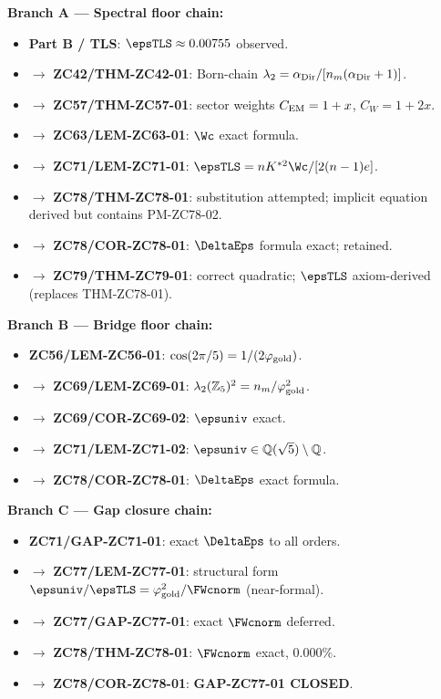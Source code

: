 \documentclass[12pt, a4paper]{article}
\begin{document}
\begin{genealogybox}[title={How ZC78's Key Objects Trace Back}]

\textbf{Branch A --- Spectral floor chain:}
\begin{itemize}[leftmargin=2em, noitemsep]
  \item \textbf{Part B / TLS}: $\epsTLS \approx 0.00755$ observed.
  \item $\to$ \textbf{ZC42/THM-ZC42-01}: Born-chain
    $\lambda_2 = \alpha_{\rm Dir}/[n_m(\alpha_{\rm Dir}+1)]$.
  \item $\to$ \textbf{ZC57/THM-ZC57-01}: sector weights
    $C_{\rm EM} = 1+x$, $C_W = 1+2x$.
  \item $\to$ \textbf{ZC63/LEM-ZC63-01}: $\Wc$ exact formula.
  \item $\to$ \textbf{ZC71/LEM-ZC71-01}: $\epsTLS = n K^{*2}\Wc/[2(n-1)e]$.
  \item $\to$ \textbf{ZC78/THM-ZC78-01}: substitution attempted;
    implicit equation derived but contains PM-ZC78-02.
  \item $\to$ \textbf{ZC78/COR-ZC78-01}: $\DeltaEps$ formula exact;
    retained.
  \item $\to$ \textbf{ZC79/THM-ZC79-01}: correct quadratic;
    $\epsTLS$ axiom-derived (replaces THM-ZC78-01).
\end{itemize}

\textbf{Branch B --- Bridge floor chain:}
\begin{itemize}[leftmargin=2em, noitemsep]
  \item \textbf{ZC56/LEM-ZC56-01}: $\cos(2\pi/5) = 1/(2\varphi_{\rm gold})$.
  \item $\to$ \textbf{ZC69/LEM-ZC69-01}: $\lambda_2(\mathbb{Z}_5)^2
    = n_m/\varphi_{\rm gold}^2$.
  \item $\to$ \textbf{ZC69/COR-ZC69-02}: $\epsuniv$ exact.
  \item $\to$ \textbf{ZC71/LEM-ZC71-02}: $\epsuniv \in
    \mathbb{Q}(\sqrt{5})\setminus\mathbb{Q}$.
  \item $\to$ \textbf{ZC78/COR-ZC78-01}: $\DeltaEps$ exact formula.
\end{itemize}

\textbf{Branch C --- Gap closure chain:}
\begin{itemize}[leftmargin=2em, noitemsep]
  \item \textbf{ZC71/GAP-ZC71-01}: exact $\DeltaEps$ to all orders.
  \item $\to$ \textbf{ZC77/LEM-ZC77-01}: structural form
    $\epsuniv/\epsTLS = \varphi_{\rm gold}^2/\FWcnorm$ (near-formal).
  \item $\to$ \textbf{ZC77/GAP-ZC77-01}: exact $\FWcnorm$ deferred.
  \item $\to$ \textbf{ZC78/THM-ZC78-01}: $\FWcnorm$ exact, $0.000\%$.
  \item $\to$ \textbf{ZC78/COR-ZC78-01}: \textbf{GAP-ZC77-01 CLOSED}.
\end{itemize}


\end{genealogybox}
\end{document}
